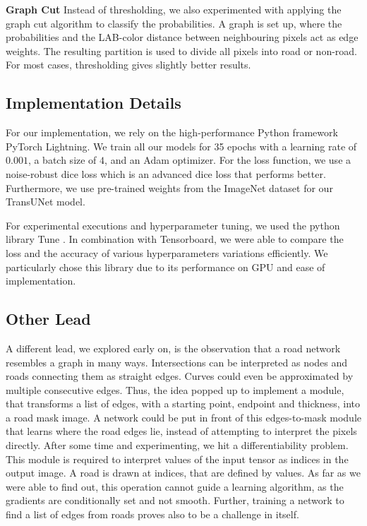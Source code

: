\documentclass[10pt,conference,compsocconf]{IEEEtran}
\begin{document}
\textbf{Graph Cut}
Instead of thresholding, we also experimented with applying the graph cut algorithm \cite{Superroad2021} to classify the probabilities.
A graph is set up, where the probabilities and the LAB-color distance between neighbouring pixels act as edge weights. The resulting partition is used to divide all pixels into road or non-road.
For most cases, thresholding gives slightly better results.


\subsection{Implementation Details}
For our implementation, we rely on the high-performance Python framework PyTorch Lightning. We train all our models for 35 epochs with a learning rate of $0.001$, a batch size of $4$, and an Adam optimizer. For the loss function, we use a noise-robust dice loss which is an advanced dice loss that performs better. Furthermore, we use pre-trained weights from the ImageNet dataset \cite{dosovitskiy2020vit} for our TransUNet model.

For experimental executions and hyperparameter tuning, we used the python library Tune \cite{liaw2018tune}. In combination with Tensorboard, we were able to compare the loss and the accuracy of various hyperparameters variations efficiently. We particularly chose this library due to its performance on GPU and  ease of implementation.



\subsection{Other Lead}
A different lead, we explored early on, is the observation that a road network resembles a graph in many ways. Intersections can be interpreted as nodes and roads connecting them as straight edges. Curves could even be approximated by multiple consecutive edges. Thus, the idea popped up to implement a module, that transforms a list of edges, with a starting point, endpoint and thickness, into a road mask image. A network could be put in front of this edges-to-mask module that learns where the road edges lie, instead of attempting to interpret the pixels directly. After some time and experimenting, we hit a differentiability problem. This module is required to interpret values of the input tensor as indices in the output image. A road is drawn at indices, that are defined by values. As far as we were able to find out, this operation cannot guide a learning algorithm, as the gradients are conditionally set and not smooth. Further, training a network to find a list of edges from roads proves also to be a challenge in itself.
\end{document}
